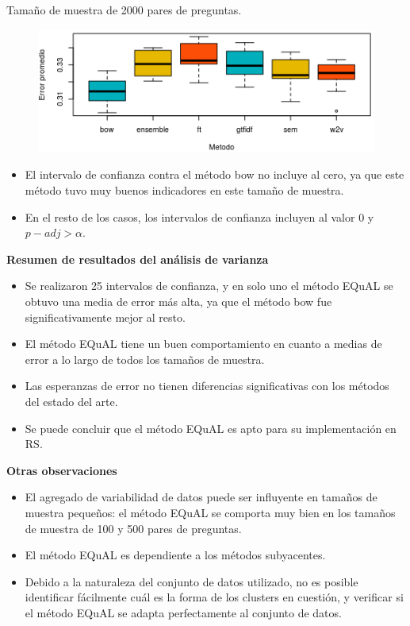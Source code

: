 \begin{frame}
	\framebreak

	Tamaño de muestra de 2000 pares de preguntas.
	\begin{figure}[!htbp]
		\centering
		\includegraphics[width=0.7\linewidth]{../10_resultados/imagenes/anova_2000}
		\label{fig:anova2000-1}
	\end{figure}

	\begin{itemize}
		\item El intervalo de confianza contra el método bow no incluye al cero, ya que este método tuvo muy buenos indicadores en este tamaño de muestra.
		\item En el resto de los casos, los intervalos de confianza incluyen al valor 0 y \(p{-}adj > \alpha\).
	\end{itemize}

	\framebreak

	\normalsize
	\textbf{Resumen de resultados del análisis de varianza}

	\begin{itemize}
		\item Se realizaron 25 intervalos de confianza, y en solo uno el método EQuAL se obtuvo una media de error más alta, ya que el método bow fue significativamente mejor al resto.
		\item El método EQuAL tiene un buen comportamiento en cuanto a medias de error a lo largo de todos los tamaños de muestra.
		\item Las esperanzas de error no tienen diferencias significativas con los métodos del estado del arte.
		\item Se puede concluir que el método EQuAL es apto para su implementación en RS.
	\end{itemize}

	\framebreak

	\textbf{Otras observaciones}
	\begin{itemize}
		\item El agregado de variabilidad de datos puede ser influyente en tamaños de muestra pequeños: el método EQuAL se comporta muy bien en los tamaños de muestra de 100 y 500 pares de preguntas.
		\item El método EQuAL es dependiente a los métodos subyacentes.
		\item Debido a la naturaleza del conjunto de datos utilizado, no es posible identificar fácilmente cuál es la forma de los clusters en cuestión, y verificar si el método EQuAL se adapta perfectamente al conjunto de datos.
	\end{itemize}

\end{frame}

